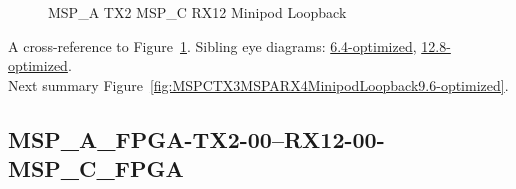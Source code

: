 \begin{figure}[h]
\begin{subfigure}{0.33\textwidth}
\hyperref[sec:MSPAFPGATX206RX1206MSPCFPGA9.6-optimized]{}
\end{subfigure}\hspace*{\fill}
\begin{subfigure}{0.33\textwidth}
\hyperref[sec:MSPAFPGATX207RX1207MSPCFPGA9.6-optimized]{}
\end{subfigure}\hspace*{\fill}
\begin{subfigure}{0.33\textwidth}
\hyperref[sec:MSPAFPGATX208RX1208MSPCFPGA9.6-optimized]{}
\end{subfigure}

\begin{subfigure}{0.33\textwidth}
\hyperref[sec:MSPAFPGATX209RX1209MSPCFPGA9.6-optimized]{}
\end{subfigure}\hspace*{\fill}
\begin{subfigure}{0.33\textwidth}
\hyperref[sec:MSPAFPGATX210RX1210MSPCFPGA9.6-optimized]{}
\end{subfigure}\hspace*{\fill}
\begin{subfigure}{0.33\textwidth}
\hyperref[sec:MSPAFPGATX211RX1211MSPCFPGA9.6-optimized]{}
\end{subfigure}

\caption{MSP\_A TX2 MSP\_C RX12 Minipod Loopback} \label{fig:MSPATX2MSPCRX12MinipodLoopback9.6-optimized}
\end{figure}

A cross-reference to Figure~\ref{fig:MSPATX2MSPCRX12MinipodLoopback9.6-optimized}.
Sibling eye diagrams: \hyperref[sec:MSPATX2MSPCRX12MinipodLoopback6.4-optimized]{6.4-optimized}, \hyperref[sec:MSPATX2MSPCRX12MinipodLoopback12.8-optimized]{12.8-optimized}. \\
Next summary Figure~\ref{fig:MSPCTX3MSPARX4MinipodLoopback9.6-optimized}.
\clearpage
% 
\subsection{MSP\_A\_FPGA-TX2-00--RX12-00-MSP\_C\_FPGA}\label{sec:MSPAFPGATX200RX1200MSPCFPGA9.6-optimized}

